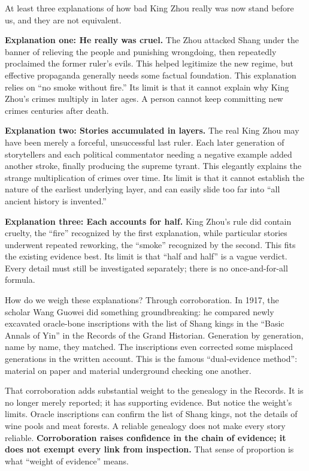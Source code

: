 At least three explanations of how bad King Zhou really was now stand before us, and they are not equivalent.

\textbf{Explanation one: He really was cruel.} The Zhou attacked Shang under the banner of relieving the people and punishing wrongdoing, then repeatedly proclaimed the former ruler's evils. This helped legitimize the new regime, but effective propaganda generally needs some factual foundation. This explanation relies on ``no smoke without fire.'' Its limit is that it cannot explain why King Zhou's crimes multiply in later ages. A person cannot keep committing new crimes centuries after death.

\textbf{Explanation two: Stories accumulated in layers.} The real King Zhou may have been merely a forceful, unsuccessful last ruler. Each later generation of storytellers and each political commentator needing a negative example added another stroke, finally producing the supreme tyrant. This elegantly explains the strange multiplication of crimes over time. Its limit is that it cannot establish the nature of the earliest underlying layer, and can easily slide too far into ``all ancient history is invented.''

\textbf{Explanation three: Each accounts for half.} King Zhou's rule did contain cruelty, the ``fire'' recognized by the first explanation, while particular stories underwent repeated reworking, the ``smoke'' recognized by the second. This fits the existing evidence best. Its limit is that ``half and half'' is a vague verdict. Every detail must still be investigated separately; there is no once-and-for-all formula.

How do we weigh these explanations? Through corroboration. In 1917, the scholar Wang Guowei did something groundbreaking: he compared newly excavated oracle-bone inscriptions with the list of Shang kings in the ``Basic Annals of Yin'' in the Records of the Grand Historian. Generation by generation, name by name, they matched. The inscriptions even corrected some misplaced generations in the written account. This is the famous ``dual-evidence method'': material on paper and material underground checking one another.

That corroboration adds substantial weight to the genealogy in the Records. It is no longer merely reported; it has supporting evidence. But notice the weight's limits. Oracle inscriptions can confirm the list of Shang kings, not the details of wine pools and meat forests. A reliable genealogy does not make every story reliable. \textbf{Corroboration raises confidence in the chain of evidence; it does not exempt every link from inspection.} That sense of proportion is what ``weight of evidence'' means.

